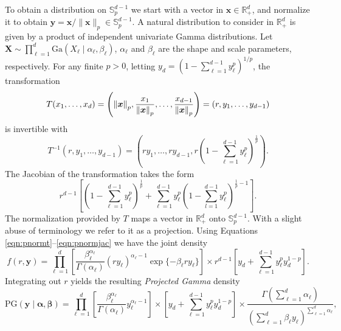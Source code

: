 To obtain a distribution on 
${\mathbb S}_{p}^{d-1}$ 
we start with a vector in 
$\bm{x} \in {\mathbb R}^d_+$, and normalize it to obtain 
$\bm{y} = \bm{x}/\|\bm{x}\|_p \in {\mathbb S}_p^{d-1}$. 
A natural  distribution to consider in ${\mathbb R}^d_+$ is given by a product of independent
  univariate Gamma distributions. Let
    $\bm{ X} \sim \prod_{\ell = 1}^d\text{Ga}\left(X_{\ell}\mid\alpha_{\ell},\beta_{\ell}\right)$, 
    $\alpha_\ell$ and $\beta_\ell$ are the shape and scale parameters, respectively. 
    For any finite $p>0$, letting 
   $ y_d = (1 - {\textstyle\sum}_{\ell = 1}^{d-1}y_{\ell}^p)^{1/p}$,
    the transformation
  \begin{equation}
    \label{eqn:pnormt}
    T(x_1,\ldots,x_d) = \left(\pnorm{\bm{x}}{p}, \frac{x_1}{\pnorm{\bm{x}}{p}},
                          \ldots , \frac{x_{d-1}}{\pnorm{\bm{x}}{p}}\right) 
                          = (r,y_1,\ldots,y_{d-1})
  \end{equation}
  is invertible with
  \begin{equation}
    \label{eqn:pnormtinv}
    T^{-1}\left(r,y_1,\ldots,y_{d-1}\right)=
        \left(ry_1,\ldots,ry_{d-1}, 
        r\left(1 - {\textstyle\sum}_{\ell = 1}^{d-1}y_{\ell}^p\right)^{\frac{1}{p}}\right).
  \end{equation}
  The Jacobian of the transformation takes the form
  \begin{equation}
    \label{eqn:pnormjac}
    r^{d-1}\left[\left(1 - {\textstyle\sum}_{\ell = 1}^{d-1}y_{\ell}^p\right)^{\frac{1}{p}} \right.
        + \left. {\textstyle\sum}_{\ell = 1}^{d-1}y_{\ell}^p
          \left(1 - {\textstyle\sum}_{l=1}^{d-1} y_{\ell}^p\right)^{\frac{1}{p} - 1}\right].
  \end{equation}
  The normalization provided by $T$ maps a vector in ${\mathbb R}_+^d$ onto
  ${\mathbb S}_p^{d-1} $. With a slight abuse of terminology we refer to it as a
  projection. Using Equations \eqref{eqn:pnormt}--\eqref{eqn:pnormjac} we have the joint density
  \begin{equation}
  \label{joint}
    f(r,\bm{ y}) = \prod_{\ell = 1}^{d}
      \left[\frac{\beta_{\ell}^{\alpha_{\ell}}}{\Gamma(\alpha_{\ell})}(ry_{\ell})^{\alpha_{\ell} - 1}
          \exp\lbrace-\beta_{\ell}ry_{\ell}\rbrace\right] \times  r^{d-1}\left[y_d +
            {\textstyle \sum}_{\ell = 1}^{d-1}y_{\ell}^p y_d^{1 - p}\right].
  \end{equation}
  Integrating out $r$ yields the resulting \emph{Projected Gamma} density
  \begin{equation}
    \label{eqn:projgamma}
    \text{PG}(\bm{ y}\mid\bm{ \alpha},\bm{ \beta}) =
          \prod_{\ell = 1}^d\left[\frac{\beta_{\ell}^{\alpha_{\ell}}}{\Gamma(\alpha_{\ell})}
                y_{\ell}^{\alpha_{\ell} - 1}\right]  \times \left[y_d +
          {\textstyle \sum}_{\ell = 1}^{d-1}y_{\ell}^p y_d^{1 - p}\right]
      \times \frac{\Gamma({\textstyle\sum}_{\ell = 1}^d\alpha_{\ell})}{\left({\textstyle\sum}_{\ell = 1}^d
                    \beta_{\ell}y_{\ell}\right)^{{\scriptstyle\sum_{\ell = 1}^d \alpha_{\ell}}}},
  \end{equation}
